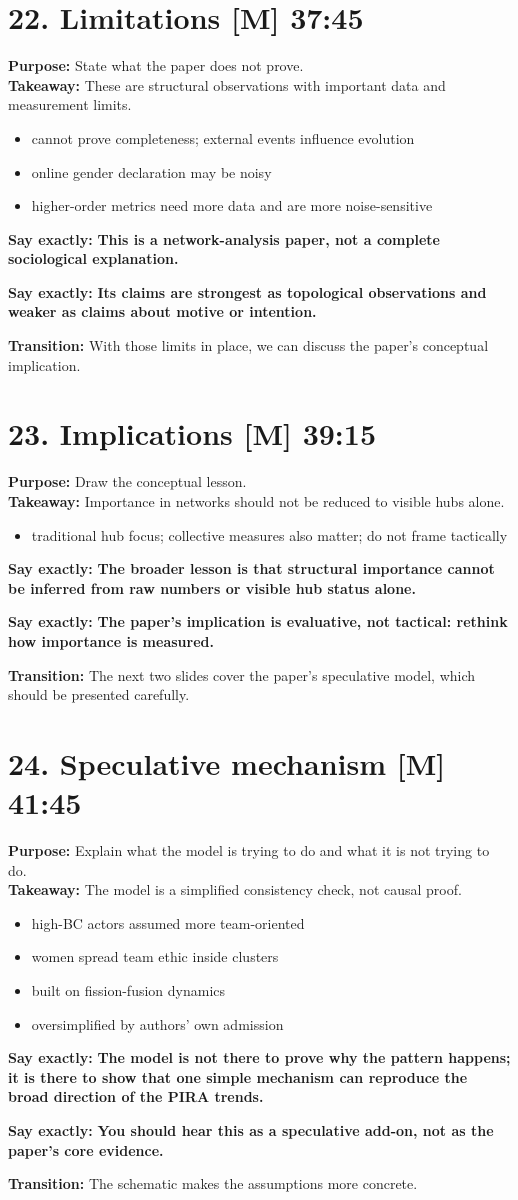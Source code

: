\documentclass[11pt,a4paper]{article}
\newcommand{\slide}[4]{%
\section*{#1 \hfill {\normalsize #2}}
\textbf{Purpose:} #3\\
\textbf{Takeaway:} #4
}
\newcommand{\boldline}[1]{\par\textbf{Say exactly:} \textbf{#1}}
\newcommand{\transition}[1]{\par\textbf{Transition:} #1}
\newcommand{\labelbox}[1]{\textbf{[#1]}}
\begin{document}
\slide{22. Limitations \labelbox{M}}{37:45}{State what the paper does not prove.}{These are structural observations with important data and measurement limits.}
\begin{itemize}
\item cannot prove completeness; external events influence evolution
\item online gender declaration may be noisy
\item higher-order metrics need more data and are more noise-sensitive
\end{itemize}
\boldline{This is a network-analysis paper, not a complete sociological explanation.}
\boldline{Its claims are strongest as topological observations and weaker as claims about motive or intention.}
\transition{With those limits in place, we can discuss the paper’s conceptual implication.}

\slide{23. Implications \labelbox{M}}{39:15}{Draw the conceptual lesson.}{Importance in networks should not be reduced to visible hubs alone.}
\begin{itemize}
\item traditional hub focus; collective measures also matter; do not frame tactically
\end{itemize}
\boldline{The broader lesson is that structural importance cannot be inferred from raw numbers or visible hub status alone.}
\boldline{The paper’s implication is evaluative, not tactical: rethink how importance is measured.}
\transition{The next two slides cover the paper’s speculative model, which should be presented carefully.}

\slide{24. Speculative mechanism \labelbox{M}}{41:45}{Explain what the model is trying to do and what it is not trying to do.}{The model is a simplified consistency check, not causal proof.}
\begin{itemize}
\item high-BC actors assumed more team-oriented
\item women spread team ethic inside clusters
\item built on fission-fusion dynamics
\item oversimplified by authors’ own admission
\end{itemize}
\boldline{The model is not there to prove why the pattern happens; it is there to show that one simple mechanism can reproduce the broad direction of the PIRA trends.}
\boldline{You should hear this as a speculative add-on, not as the paper’s core evidence.}
\transition{The schematic makes the assumptions more concrete.}
\end{document}
